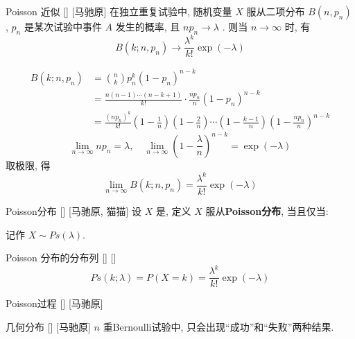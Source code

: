 \documentclass[UTF8]{ctexart}
\begin{document}
        \begin{thm}
            []
            {Poisson 近似}
            []
            [马驰原]
            在独立重复试验中, 随机变量 \(X\) 服从二项分布 \(B(n,p_n)\) , \(p_n\) 是某次试验中事件 \(A\) 发生的概率, 且 \(np_n\to\lambda \) . 则当 \(n\to\infty\) 时, 有\[B(k;n,p_n)\to\frac{\lambda^k}{k!}\exp (-\lambda) \]
        \end{thm}

        \begin{prf}
            \[
                \begin{aligned}
                    B(k;n,p_n) &= \binom{n}{k}p_n^k(1-p_n)^{n-k}\\
                    &=\frac{n(n-1)\cdots(n-k+1)}{k!}\cdot\frac{np_n}{n}\left(1-p_n \right)^{n-k}\\
                    &=\frac{(np_n)^k}{k!}\left(1-\frac{1}{n} \right)\left(1-\frac{2}{n} \right)\cdots\left(1-\frac{k-1}{n} \right)\left(1-\frac{np_n}{n} \right)^{n-k}        
                \end{aligned}
            \]
            \[\lim_{n\to\infty}np_n=\lambda,\quad\lim_{n\to\infty}\left(1-\frac{\lambda}{n} \right)^{n-k}=\exp(-\lambda) \]
            取极限, 得\[\lim_{n\to\infty} B(k;n,p_n)=\frac{\lambda^k}{k!}\exp (-\lambda) \]
        \end{prf}

        \begin{dfn}
            []
            {Poisson分布}
            []
            [马驰原, 猫猫]
            设 \(X\) 是, 定义 \(X\) 服从\textbf{Poisson分布}, 当且仅当: 
            
            记作 \(X\sim Ps(\lambda)\).
        \end{dfn}

        \begin{ppt}
            []
            {Poisson 分布的分布列}
            []
            []
            \[Ps(k;\lambda)=P(X=k)=\frac{\lambda^k}{k!}\exp (-\lambda)\]
        \end{ppt}

        \begin{dfn}
            []
            {Poisson过程}
            []
            [马驰原]
        \end{dfn}

        \begin{dfn}
            []
            {几何分布}
            []
            [马驰原]
             \(n\) 重Bernoulli试验中, 只会出现“成功”和“失败”两种结果. 
        \end{dfn}
\end{document}
